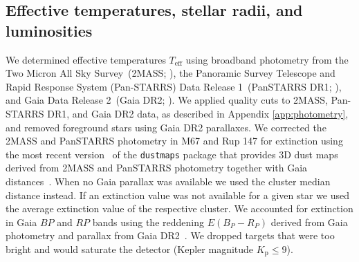 \documentclass{aa}
\begin{document}
\subsection{Effective temperatures, stellar radii, and luminosities}
\label{TeffRL}
We determined effective temperatures $T_\mathrm{eff}$ using broadband photometry from the Two Micron All Sky Survey~(2MASS; \citealt{skrutskie_two_2006}), the Panoramic Survey Telescope and Rapid Response System \mbox{(Pan-STARRS)} Data Release 1~(PanSTARRS DR1; \citealt{2016arXiv161205560C}), and Gaia Data Release 2~(Gaia DR2; \citealt{gaia2016, gaia2018}). We applied quality cuts to 2MASS, Pan-STARRS DR1, and Gaia DR2 data, as described in Appendix \ref{app:photometry}, and removed foreground stars using Gaia DR2 parallaxes. We corrected the 2MASS and PanSTARRS photometry in M67 and Rup 147 for extinction using the most recent version~\citep{green_bayestar_2019} of the \texttt{dustmaps} package that provides 3D dust maps derived from 2MASS and PanSTARRS photometry together with Gaia distances~\citep{green_dustmaps_2018}. When no Gaia parallax was available we used the cluster median distance instead. If an extinction value was not available for a given star we used the average extinction value of the respective cluster. We accounted for extinction in Gaia $BP$ and $RP$ bands using the reddening $E(B_P-R_P)$ derived from Gaia photometry and parallax from Gaia DR2~\citep{andrae_gaiaapsis_2018}. We dropped targets that were too bright and would saturate the detector (Kepler magnitude $K_\mathrm{p} \leq 9$).
\end{document}
